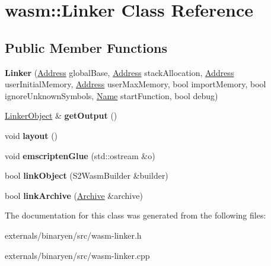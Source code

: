 \hypertarget{classwasm_1_1_linker}{}\section{wasm\+:\+:Linker Class Reference}
\label{classwasm_1_1_linker}
\subsection*{Public Member Functions}
\begin{DoxyCompactItemize}
\item 
\mbox{\label{classwasm_1_1_linker_a3fe3b385c541b1d011006a0ee972184d}} 
{\bfseries Linker} (\mbox{\hyperlink{structwasm_1_1_address}{Address}} global\+Base, \mbox{\hyperlink{structwasm_1_1_address}{Address}} stack\+Allocation, \mbox{\hyperlink{structwasm_1_1_address}{Address}} user\+Initial\+Memory, \mbox{\hyperlink{structwasm_1_1_address}{Address}} user\+Max\+Memory, bool import\+Memory, bool ignore\+Unknown\+Symbols, \mbox{\hyperlink{structwasm_1_1_name}{Name}} start\+Function, bool debug)
\item 
\mbox{\label{classwasm_1_1_linker_a91f056f375c04b7c0c3d977dd448a78f}} 
\mbox{\hyperlink{classwasm_1_1_linker_object}{Linker\+Object}} \& {\bfseries get\+Output} ()
\item 
\mbox{\label{classwasm_1_1_linker_ad2d719645b45d8669488e9efc7e493d1}} 
void {\bfseries layout} ()
\item 
\mbox{\label{classwasm_1_1_linker_a724669f5d6b5bdd6fbbf6a628e05e991}} 
void {\bfseries emscripten\+Glue} (std\+::ostream \&o)
\item 
\mbox{\label{classwasm_1_1_linker_a39c739ec8ac400fffc74aa47a27f4d45}} 
bool {\bfseries link\+Object} (S2\+Wasm\+Builder \&builder)
\item 
\mbox{\label{classwasm_1_1_linker_ae35aa87ecf6f3b7b318cd29faa56f341}} 
bool {\bfseries link\+Archive} (\mbox{\hyperlink{class_archive}{Archive}} \&archive)
\end{DoxyCompactItemize}


The documentation for this class was generated from the following files\+:\begin{DoxyCompactItemize}
\item 
externals/binaryen/src/wasm-\/linker.\+h\item 
externals/binaryen/src/wasm-\/linker.\+cpp\end{DoxyCompactItemize}

